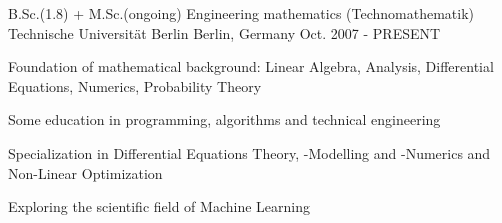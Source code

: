 


\begin{cventries}


\cventry
{B.Sc.(1.8) + M.Sc.(ongoing) Engineering mathematics (Technomathematik)} %
{Technische Universität Berlin} %
{Berlin, Germany} %
{Oct. 2007 - PRESENT} %
{ %
\begin{cvitems}
\item {Foundation of mathematical background: Linear Algebra, Analysis, Differential Equations, Numerics, Probability Theory}
\item {Some education in programming, algorithms and technical engineering}
\item {Specialization in Differential Equations Theory, -Modelling and -Numerics and Non-Linear Optimization}
\item{Exploring the scientific field of Machine Learning}
\end{cvitems}
}


\end{cventries}